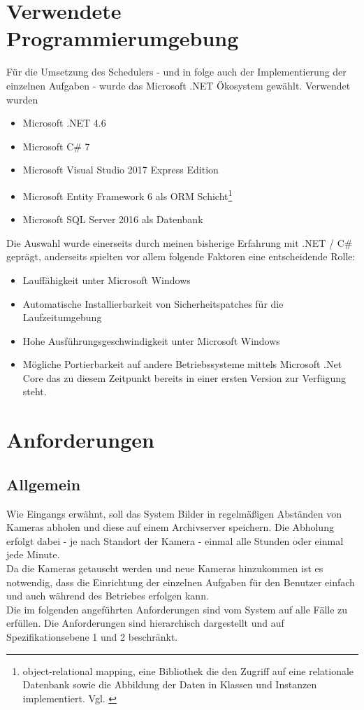 \section{Verwendete Programmierumgebung}
Für die Umsetzung des Schedulers - und in folge auch der Implementierung der einzelnen Aufgaben - wurde das Microsoft .NET Ökosystem gewählt. Verwendet wurden
\begin{itemize}
	\item Microsoft .NET 4.6
	\item Microsoft C\# 7
	\item Microsoft Visual Studio 2017 Express Edition
	\item Microsoft Entity Framework 6 als ORM Schicht\footnote{object-relational mapping, eine Bibliothek die den Zugriff auf eine relationale Datenbank sowie die Abbildung der Daten in Klassen und Instanzen implementiert. Vgl. \parencite{ef_orm} }
	\item Microsoft SQL Server 2016 als Datenbank
\end{itemize}
Die Auswahl wurde einerseits durch meinen bisherige Erfahrung mit .NET / C\# geprägt, anderseits spielten vor allem folgende Faktoren eine entscheidende Rolle:
\begin{itemize}
	\item Lauffähigkeit unter Microsoft Windows
	\item Automatische Installierbarkeit von Sicherheitspatches für die Laufzeitumgebung
	\item Hohe Ausführungsgeschwindigkeit unter Microsoft Windows
	\item Mögliche Portierbarkeit auf andere Betriebssysteme mittels Microsoft .Net Core das zu diesem Zeitpunkt bereits in einer ersten Version zur Verfügung steht.
\end{itemize}
\section{Anforderungen}\label{chap:Anforderungen}
\subsection{Allgemein}
Wie Eingangs erwähnt, soll das System Bilder in regelmäßigen Abständen von Kameras abholen und diese auf einem Archivserver speichern. Die Abholung erfolgt dabei - je nach Standort der Kamera - einmal alle Stunden oder einmal jede Minute.\\
Da die Kameras getauscht werden und neue Kameras hinzukommen ist es notwendig, dass die Einrichtung der einzelnen Aufgaben für den Benutzer einfach und auch während des Betriebes erfolgen kann.\\
Die im folgenden angeführten Anforderungen sind vom System auf alle Fälle zu erfüllen. Die Anforderungen sind hierarchisch dargestellt und auf Spezifikationsebene 1 und 2 beschränkt\parencite[S. 45]{rupp2009}.
